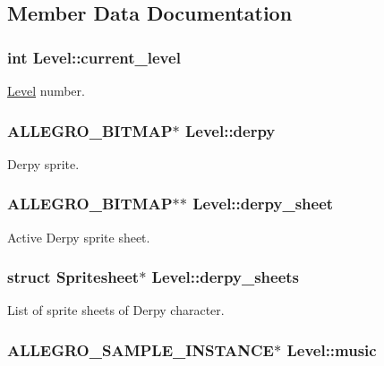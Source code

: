 \subsection{\-Member \-Data \-Documentation}
\hypertarget{structLevel_a1ba3ee0104c912dde5d6e70fee889512}{
\subsubsection[{current\-\_\-level}]{\setlength{\rightskip}{0pt plus 5cm}int {\bf \-Level\-::current\-\_\-level}}}\label{structLevel_a1ba3ee0104c912dde5d6e70fee889512}
\hyperlink{structLevel}{\-Level} number. \hypertarget{structLevel_ae33832497116b7a0c184959bbde21ee5}{
\subsubsection[{derpy}]{\setlength{\rightskip}{0pt plus 5cm}\-A\-L\-L\-E\-G\-R\-O\-\_\-\-B\-I\-T\-M\-A\-P$\ast$ {\bf \-Level\-::derpy}}}\label{structLevel_ae33832497116b7a0c184959bbde21ee5}
\-Derpy sprite. \hypertarget{structLevel_a0e02f3a5674a2ad3c23de22b6a4ed044}{
\subsubsection[{derpy\-\_\-sheet}]{\setlength{\rightskip}{0pt plus 5cm}\-A\-L\-L\-E\-G\-R\-O\-\_\-\-B\-I\-T\-M\-A\-P$\ast$$\ast$ {\bf \-Level\-::derpy\-\_\-sheet}}}\label{structLevel_a0e02f3a5674a2ad3c23de22b6a4ed044}
\-Active \-Derpy sprite sheet. \hypertarget{structLevel_aad19c0af5ac43ceb72df311d89bd4297}{
\subsubsection[{derpy\-\_\-sheets}]{\setlength{\rightskip}{0pt plus 5cm}struct {\bf \-Spritesheet}$\ast$ {\bf \-Level\-::derpy\-\_\-sheets}}}\label{structLevel_aad19c0af5ac43ceb72df311d89bd4297}
\-List of sprite sheets of \-Derpy character. \hypertarget{structLevel_a41c6aae8f508e078b02c291e1d6f8e67}{
\subsubsection[{music}]{\setlength{\rightskip}{0pt plus 5cm}\-A\-L\-L\-E\-G\-R\-O\-\_\-\-S\-A\-M\-P\-L\-E\-\_\-\-I\-N\-S\-T\-A\-N\-C\-E$\ast$ {\bf \-Level\-::music}}}\label{structLevel_a41c6aae8f508e078b02c291e1d6f8e67}
